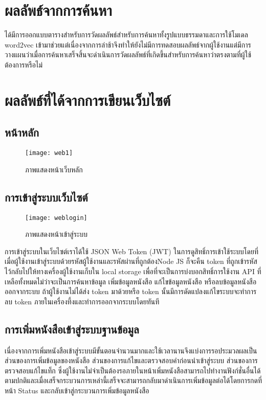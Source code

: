 \section{ผลลัพธ์จากการค้นหา}

ได้มีการออกแบบตารางสำหรับการวัดผลลัพธ์สำหรับการค้นหาทั้งรูปแบบธรรมดาและการใช้โมเดล word2vec เข้ามาช่วยแต่เนื่องจากการล่าช้าจึงทำให้ยังไม่มีการทดสอบผลลัพธ์จากผู้ใช้งานแต่มีการวางแผนว่าเมื่อการค้นหาเสร็จสิ้นจะดำเนินการวัดผลลัพธ์ที่เกิดขึ้นสำหรับการค้นหาว่าตรงตามที่ผู้ใช้ต้องการหรือไม่

\section{ผลลัพธ์ที่ได้จากการเขียนเว็บไซต์}
\subsection{หน้าหลัก}
\begin{figure}[H]
    \centering
    \texttt{[image: web1]}
    \caption{ภาพแสดงหน้าเว็บหลัก}\label{fig:web1}
\end{figure}

\subsection{การเข้าสู่ระบบเว็บไซต์}
\begin{figure}[H]
    \centering
    \texttt{[image: weblogin]}
    \caption{ภาพแสดงหน้าเข้าสู่ระบบ}\label{fig:weblogin}
\end{figure}
การเข้าสู่ระบบในเว็บไซต์เราได้ใช้ JSON Web Token (JWT) ในการดูสิทธิ์การเข้าใช้ระบบโดยที่เมื่อผู้ใช้งานเข้าสู่ระบบด้วยรหัสผู้ใช้งานและรหัสผ่านที่ถูกต้องNode JS ก็จะคืน token ที่ถูกเข้ารหัสไว้กลับไปให้ทางเครื่องผู้ใช้งานเก็บใน local storage เพื่อที่จะเป็นการบ่งบอกสิทธิ์การใช้งาน API ที่เหลือทั้งหมดไม่ว่าจะเป็นการค้นหาข้อมูล เพิ่มข้อมูลหนังสือ แก้ไขข้อมูลหนังสือ หรือลบข้อมูลหนังสือออกจากระบบ ถ้าผู้ใช้งานไม่ได้ส่ง token มาด้วยหรือ token นั้นมีการดัดแปลงแก้ไขระบบจะทำการลบ token ภายในเครื่องทึ้งและทำการออกจากระบบโดยทันที

\subsection{การเพิ่มหนังสือเข้าสู่ระบบฐานข้อมูล}
เนื่องจากการเพิ่มหนังสือเข้าสู่ระบบมีขั้นตอนจำนวนมากและใช้เวลานานจึงแบ่งการรอประมวลผลเป็นส่วนของการเพิ่มข้อมูลของหนังสือ ส่วนของการแก้ไขและตรวจสอบคำก่อนนำเข้าสู่ระบบ ส่วนของการตรวจสอบแก้ไขแท็ก ซึ่งผู้ใช้งานไม่จำเป็นต้องรอภายในหน้าเพิ่มหนังสือสามารถไปทำงานฟังก์ชั่นอื่นได้ตามปกติและเมื่อเสร็จกระบวนการเหล่านี้เสร็จจะสามารถกลับมาดำเนินการเพิ่มข้อมูลต่อได้โดยการกดที่หน้า Status และกลับเข้าสู่กระบวนการเพิ่มข้อมูลหนังสือ
